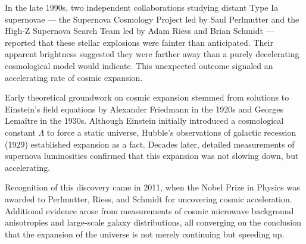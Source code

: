 \begin{historical}
In the late 1990s, two independent collaborations studying distant Type Ia supernovae — the Supernova Cosmology Project led by Saul Perlmutter and the High-Z Supernova Search Team led by Adam Riess and Brian Schmidt — reported that these stellar explosions were fainter than anticipated. Their apparent brightness suggested they were farther away than a purely decelerating cosmological model would indicate. This unexpected outcome signaled an accelerating rate of cosmic expansion. 

Early theoretical groundwork on cosmic expansion stemmed from solutions to Einstein’s field equations by Alexander Friedmann in the 1920s and Georges Lemaître in the 1930s. Although Einstein initially introduced a cosmological constant $\Lambda$ to force a static universe, Hubble’s observations of galactic recession (1929) established expansion as a fact. Decades later, detailed measurements of supernova luminosities confirmed that this expansion was not slowing down, but accelerating.

Recognition of this discovery came in 2011, when the Nobel Prize in Physics was awarded to Perlmutter, Riess, and Schmidt for uncovering cosmic acceleration. Additional evidence arose from measurements of cosmic microwave background anisotropies and large-scale galaxy distributions, all converging on the conclusion that the expansion of the universe is not merely continuing but speeding up.
\end{historical}
